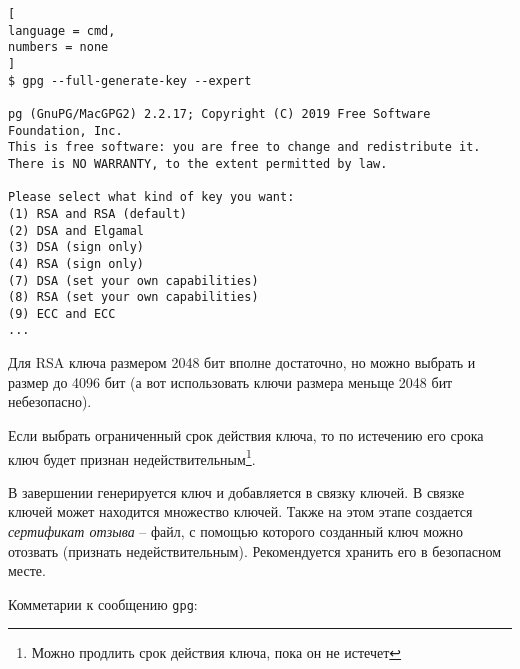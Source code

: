 \documentclass[%
	11pt,
	a4paper,
	utf8,
		]{article}
\begin{document}
\begin{lstlisting}[
language = cmd,
numbers = none
]
$ gpg --full-generate-key --expert

pg (GnuPG/MacGPG2) 2.2.17; Copyright (C) 2019 Free Software Foundation, Inc.
This is free software: you are free to change and redistribute it.
There is NO WARRANTY, to the extent permitted by law.

Please select what kind of key you want:
(1) RSA and RSA (default)
(2) DSA and Elgamal
(3) DSA (sign only)
(4) RSA (sign only)
(7) DSA (set your own capabilities)
(8) RSA (set your own capabilities)
(9) ECC and ECC
...
\end{lstlisting}


Для RSA ключа размером 2048 бит вполне достаточно, но можно выбрать и размер до 4096 бит (а вот использовать ключи размера меньще 2048 бит небезопасно).

Если выбрать ограниченный срок действия ключа, то по истечению его срока ключ будет признан недействительным\footnote{Можно продлить срок действия ключа, пока он не истечет}.

В завершении генерируется ключ и добавляется в связку ключей. В связке ключей может находится множество ключей. Также на этом этапе создается \emph{сертификат отзыва} -- файл, с помощью которого созданный ключ можно отозвать (признать недействительным). Рекомендуется хранить его в безопасном месте.

Комметарии к сообщению \texttt{gpg}:
\end{document}
